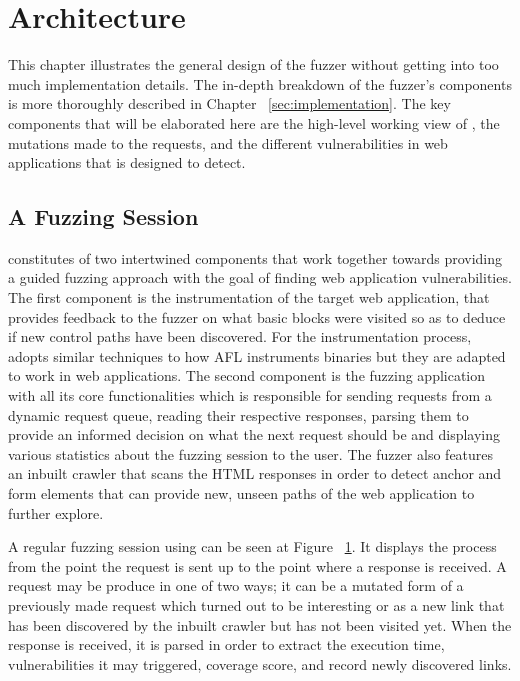 \chapter{Architecture}
\label{sec:architecture}
\minitoc
\vspace*{1cm}

This chapter illustrates the general design of the fuzzer without getting into too much implementation details. The in-depth breakdown of the fuzzer's components is more thoroughly described in Chapter ~\ref{sec:implementation}. The key components that will be elaborated here are the high-level working view of \pname{}, the mutations made to the requests, and the different vulnerabilities in web applications that \pname{} is designed to detect.

\section{A Fuzzing Session}
\pname{} constitutes of two intertwined components that work together towards providing a guided fuzzing approach with the goal of finding web application vulnerabilities. The first
component is the instrumentation of the target web application, that provides feedback to the fuzzer on what basic blocks were visited so as to deduce if new control paths have been discovered. For the instrumentation process, \pname{} adopts similar techniques to how AFL instruments binaries but they are adapted to work in web applications. The second component is the fuzzing application with all its core functionalities which is responsible for sending requests from a dynamic request queue, reading their respective responses, parsing them to provide an informed decision on what the next request should be and displaying various statistics about the fuzzing session to the user. The fuzzer also features an inbuilt crawler that scans the HTML responses in order to detect anchor and form elements that can provide new, unseen paths of the web application to further explore.

A regular fuzzing session using \pname{} can be seen at Figure ~\ref{sec:architecture}. It displays the process from the point the request is sent up to the point where a response is received. A request may be produce in one of two ways; it can be a mutated form of a previously made request which turned out to be interesting or as a new link that has been discovered by the inbuilt crawler but has not been visited yet. When the response is received, it is parsed in order to extract the execution time, vulnerabilities it may triggered, coverage score, and record newly discovered links.

